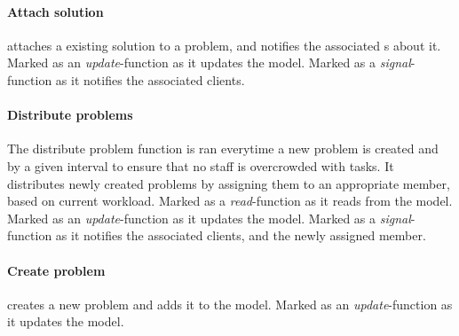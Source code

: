 \paragraph{Attach solution} attaches a existing solution to a problem, and notifies the associated \client s about it. Marked as an \textit{update}-function as it updates the model. Marked as a \textit{signal}-function as it notifies the associated clients. 

\paragraph{Distribute problems} The distribute problem function is ran everytime a new problem is created and by a given interval to ensure that no staff is overcrowded with tasks. It distributes newly created problems by assigning them to an appropriate \astaff[] member, based on current workload. %
 Marked as a \textit{read}-function as it reads from the model. Marked as an \textit{update}-function as it updates the model. Marked as a \textit{signal}-function as it notifies the associated clients, and the newly assigned \astaff[] member. 


\paragraph{Create problem} creates a new problem and adds it to the model. Marked as an \textit{update}-function as it updates the model.  


